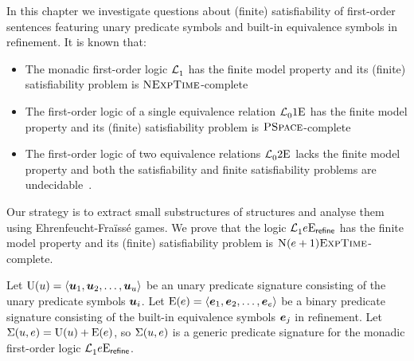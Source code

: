 
In this chapter we investigate questions about (finite) satisfiability of
first-order sentences featuring unary predicate symbols and built-in equivalence
symbols in refinement.
It is known that:
\begin{itemize}
  \item The monadic first-order logic $\mathcal{L}^{{}}_{1}$ has the finite model
  property and its (finite) satisfiability problem is
  $\text{\normalfont{\scshape NExpTime}}$-complete~\cite{Lowenheim1915}
  \item The first-order logic of a single equivalence relation
  $\mathcal{L}^{{}}_{0}{1}\mathrm{E}_{{}}$ has the finite model property and its (finite)
  satisfiability problem is $\text{\normalfont{\scshape PSpace}}$-complete~\cite{boerger1997classical}
  \item The first-order logic of two equivalence relations
  $\mathcal{L}^{{}}_{0}{2}\mathrm{E}_{{}}$ lacks the finite model property and both the
  satisfiability and finite satisfiability problems are
  undecidable~\cite{Janiczak1953}.
\end{itemize}
Our strategy is to extract small substructures of structures and analyse them
using Ehrenfeucht-Fra\"{i}ss\'{e} games.
We prove that the logic $\mathcal{L}^{{}}_{1}{e}\mathrm{E}_{\mathsf{refine}}$ has the finite model
property and its (finite) satisfiability problem is $\text{\normalfont{\scshape N}}(e+1)\text{\normalfont{\scshape ExpTime}}$-complete.

Let ${\mathrm{U}}(u) = \left\langle \bm{u}_{1},\bm{u}_{2},\dots,\bm{u}_{u} \right\rangle$ be an unary predicate
signature consisting of the unary predicate symbols $\bm{u}_{i}$.
Let ${\mathrm{E}}(e) = \left\langle \bm{e}_{1},\bm{e}_{2},\dots,\bm{e}_{e} \right\rangle$ be a binary predicate
signature consisting of the built-in equivalence symbols $\bm{e}_{j}$ in refinement.
Let $\mathrm{\Sigma}(u,e) = {\mathrm{U}}(u) + {\mathrm{E}}(e)$, so $\mathrm{\Sigma}(u,e)$ is a generic
predicate signature for the monadic first-order logic
$\mathcal{L}^{{}}_{1}{e}\mathrm{E}_{\mathsf{refine}}$.